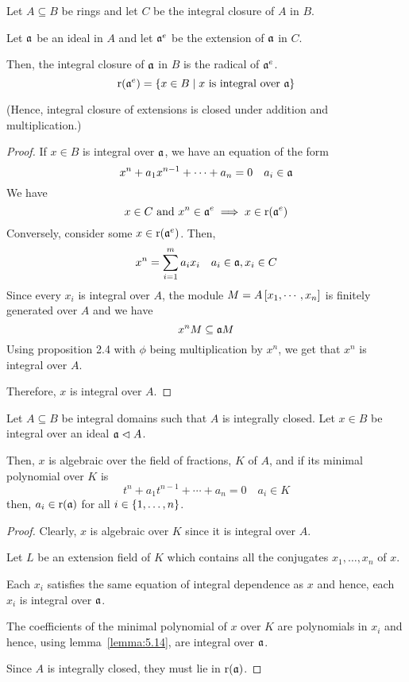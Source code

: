 \begin{lemma}{}{}
\label{lemma:5.14}
	Let \(A \subseteq B\) be rings and let \(C\) be the integral closure
	of \(A\) in \(B\).

	Let \(\mathfrak{a}\) be an ideal in \(A\) and let \(\mathfrak{a}^e\) be the extension
	of \(\mathfrak{a}\) in \(C\).

	Then, the integral closure of \(\mathfrak{a}\) in \(B\) is the radical of
	\(\mathfrak{a}^e\).
	\[
		\operatorname{r}(\mathfrak{a}^e) = \left\{ x \in B \mid x \text{ is integral over } \mathfrak{a} \right\}
	\]

	(Hence, integral closure of extensions is closed under addition and
	multiplication.)
\end{lemma}
\begin{proof}
	If \(x \in B\) is integral over \(\mathfrak{a}\), we have an equation of the form
	\[
		x^n + a_1 x^{n-1} + \cdots + a_n = 0 \quad a_i \in \mathfrak{a}
	\]
	We have
	\[
		x \in C \text{ and } x^n \in \mathfrak{a}^e \implies x \in \operatorname{r}(\mathfrak{a}^e)
	\]
	Conversely, consider some \(x \in \operatorname{r}(\mathfrak{a}^e)\).
	Then,
	\[
		x^n = \sum_{i = 1}^m a_i x_i \quad a_i \in \mathfrak{a}, x_i \in C
	\]
	Since every \(x_i\) is integral over \(A\), the module
	\(M = A\left[ x_1, \cdots, x_n \right]\) is finitely generated over \(A\)
	and we have
	\[
		x^n M \subseteq \mathfrak{a} M
	\]
	Using proposition 2.4 with \(\phi\) being multiplication by \(x^n\),
	we get that \(x^n\) is integral over \(A\).

	Therefore, \(x\) is integral over \(A\).
\end{proof}


\begin{proposition}{}{}
\label{prop:5.15}
	Let \(A \subseteq B\) be integral domains such that \(A\) is integrally
	closed.
	Let \(x \in B\) be integral over an ideal \(\mathfrak{a} \vartriangleleft A\).

	Then, \(x\) is algebraic over the field of fractions, \(K\) of \(A\),
	and if its minimal polynomial over \(K\) is
	\[
		t^n + a_1 t^{n-1} + \cdots + a_n = 0 \quad a_i \in K
	\]
	then, \(a_i \in \operatorname{r}(\mathfrak{a})\) for all \(i \in \left\{ 1, \ldots, n \right\}\).
\end{proposition}
\begin{proof}
	Clearly, \(x\) is algebraic over \(K\) since it is integral over \(A\).

	Let \(L\) be an extension field of \(K\) which contains all the
	conjugates \(x_1, \ldots, x_n\) of \(x\).

	Each \(x_i\) satisfies the same equation of integral dependence
	as \(x\) and hence, each \(x_i\) is integral over \(\mathfrak{a}\).

	The coefficients of the minimal polynomial of \(x\) over \(K\)
	are polynomials in \(x_i\) and hence, using lemma~\ref{lemma:5.14},
	are integral over \(\mathfrak{a}\).

	Since \(A\) is integrally closed, they must lie in \(\operatorname{r}(\mathfrak{a})\).
\end{proof}


